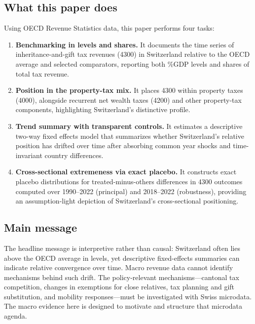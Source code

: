\documentclass[11pt,a4paper]{article}
\begin{document}
\subsection{What this paper does}
Using OECD Revenue Statistics data, this paper performs four tasks:
\begin{enumerate}
  \item \textbf{Benchmarking in levels and shares.} It documents the time series of inheritance-and-gift tax revenues (4300) in Switzerland relative to the OECD average and selected comparators, reporting both \%GDP levels and shares of total tax revenue.
  \item \textbf{Position in the property-tax mix.} It places 4300 within property taxes (4000), alongside recurrent net wealth taxes (4200) and other property-tax components, highlighting Switzerland's distinctive profile.
  \item \textbf{Trend summary with transparent controls.} It estimates a descriptive two-way fixed effects model that summarizes whether Switzerland's relative position has drifted over time after absorbing common year shocks and time-invariant country differences.
  \item \textbf{Cross-sectional extremeness via exact placebo.} It constructs exact placebo distributions for treated-minus-others differences in 4300 outcomes computed over 1990--2022 (principal) and 2018--2022 (robustness), providing an assumption-light depiction of Switzerland's cross-sectional positioning.
\end{enumerate}

\subsection{Main message}
The headline message is interpretive rather than causal: Switzerland often lies above the OECD average in levels, yet descriptive fixed-effects summaries can indicate relative convergence over time. Macro revenue data cannot identify mechanisms behind such drift. The policy-relevant mechanisms---cantonal tax competition, changes in exemptions for close relatives, tax planning and gift substitution, and mobility responses---must be investigated with Swiss microdata. The macro evidence here is designed to motivate and structure that microdata agenda.
\end{document}
